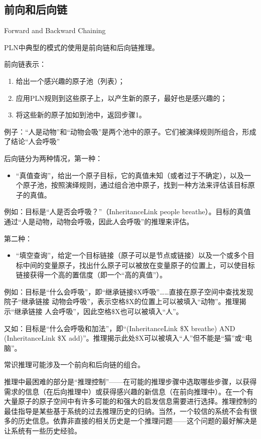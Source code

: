 \subsection{前向和后向链}{Forward and Backward Chaining}

PLN中典型的模式的使用是前向链和后向链推理。

前向链表示：

\begin{enumerate}
\item 给出一个感兴趣的原子池（列表）；
\item 应用PLN规则到这些原子上，以产生新的原子，最好也是感兴趣的；
\item 将这些新的原子加如到池中，返回步骤1。
\end{enumerate}

例子：“人是动物”和“动物会吸”是两个池中的原子。它们被演绎规则所组合，形成了结论“人会呼吸”

后向链分为两种情况，第一种：

\begin{itemize}
\item “真值查询”，给出一个原子目标，它的真值未知（或者过于不确定），以及一个原子池，按照演绎规则，通过组合池中原子，找到一种方法来评估该目标原子的真值。
\end{itemize}

例如：目标是“人是否会呼吸？”（InheritanceLink people breathe）。目标的真值通过“人是动物，动物会呼吸，因此人会呼吸”的推理来评估。

第二种：

\begin{itemize}
\item “填空查询”，给定一个目标链接（原子可以是节点或链接）以及一个或多个目标中间的变量原子，找出什么原子可以被放在变量原子的位置上，可以使目标链接获得一个高的置信度（即一个“高的真值”）。
\end{itemize}

例如：目标是“什么会呼吸”，即“继承链接\$X呼吸”……直接在原子空间中查找发现院子“继承链接 动物会呼吸”，表示空格\$X的位置上可以被填入“动物”。推理揭示“继承链接 人会呼吸”，因此空格\$X也可以被填入“人”。

又如：目标是“什么会呼吸和加法”，即“(InheritanceLink \$X breathe) AND (InheritanceLink \$X add)”。推理揭示此处\$X可以被填入“人”但不能是“猫”或“电脑”。

常识推理可能涉及一个前向和后向链的组合。

推理中最困难的部分是“推理控制”——在可能的推理步骤中选取哪些步骤，以获得需求的信息（在后向推理中）或获得感兴趣的新信息（在前向推理中）。在一个有大量原子的原子空间中有许多可能的和强大的启发信息需要进行选择。推理控制的最佳指导是某些基于系统的过去推理历史的归纳。当然，一个较信的系统不会有很多的历史信息。依靠非直接的相关历史是一个推理问题——这个问题的最好解决是让系统有一些历史经验。

